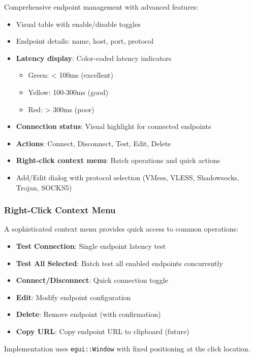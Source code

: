 Comprehensive endpoint management with advanced features:

\begin{itemize}
    \item Visual table with enable/disable toggles
    \item Endpoint details: name, host, port, protocol
    \item \textbf{Latency display}: Color-coded latency indicators
    \begin{itemize}
        \item Green: < 100ms (excellent)
        \item Yellow: 100-300ms (good)
        \item Red: > 300ms (poor)
    \end{itemize}
    \item \textbf{Connection status}: Visual highlight for connected endpoints
    \item \textbf{Actions}: Connect, Disconnect, Test, Edit, Delete
    \item \textbf{Right-click context menu}: Batch operations and quick actions
    \item Add/Edit dialog with protocol selection (VMess, VLESS, Shadowsocks, Trojan, SOCKS5)
\end{itemize}

\subsubsection{Right-Click Context Menu}

A sophisticated context menu provides quick access to common operations:

\begin{itemize}
    \item \textbf{Test Connection}: Single endpoint latency test
    \item \textbf{Test All Selected}: Batch test all enabled endpoints concurrently
    \item \textbf{Connect/Disconnect}: Quick connection toggle
    \item \textbf{Edit}: Modify endpoint configuration
    \item \textbf{Delete}: Remove endpoint (with confirmation)
    \item \textbf{Copy URL}: Copy endpoint URL to clipboard (future)
\end{itemize}

Implementation uses \texttt{egui::Window} with fixed positioning at the click location.

